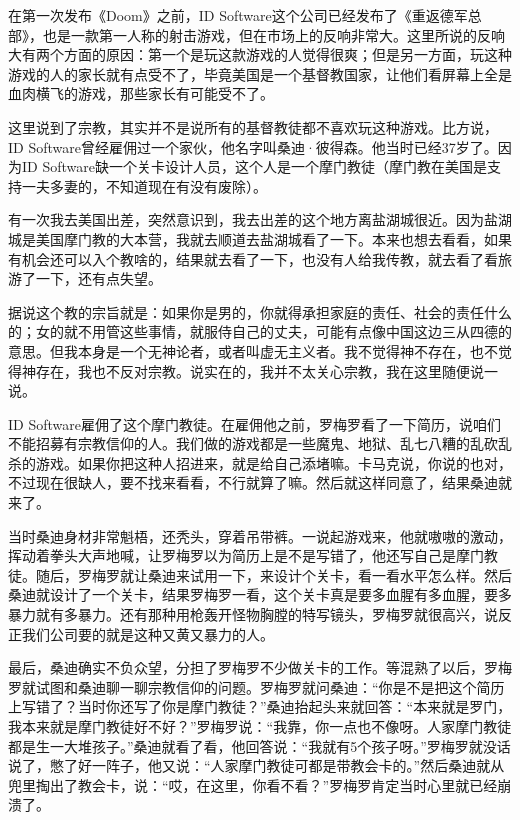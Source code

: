 \documentclass[
  letterpaper,
  DIV=11,
  numbers=noendperiod]{scrreprt}
\begin{document}
在第一次发布《Doom》之前，ID
Software这个公司已经发布了《重返德军总部》，也是一款第一人称的射击游戏，但在市场上的反响非常大。这里所说的反响大有两个方面的原因：第一个是玩这款游戏的人觉得很爽；但是另一方面，玩这种游戏的人的家长就有点受不了，毕竟美国是一个基督教国家，让他们看屏幕上全是血肉横飞的游戏，那些家长有可能受不了。

这里说到了宗教，其实并不是说所有的基督教徒都不喜欢玩这种游戏。比方说，ID
Software曾经雇佣过一个家伙，他名字叫桑迪·彼得森。他当时已经37岁了。因为ID
Software缺一个关卡设计人员，这个人是一个摩门教徒（摩门教在美国是支持一夫多妻的，不知道现在有没有废除）。

有一次我去美国出差，突然意识到，我去出差的这个地方离盐湖城很近。因为盐湖城是美国摩门教的大本营，我就去顺道去盐湖城看了一下。本来也想去看看，如果有机会还可以入个教啥的，结果就去看了一下，也没有人给我传教，就去看了看旅游了一下，还有点失望。

据说这个教的宗旨就是：如果你是男的，你就得承担家庭的责任、社会的责任什么的；女的就不用管这些事情，就服侍自己的丈夫，可能有点像中国这边三从四德的意思。但我本身是一个无神论者，或者叫虚无主义者。我不觉得神不存在，也不觉得神存在，我也不反对宗教。说实在的，我并不太关心宗教，我在这里随便说一说。

ID
Software雇佣了这个摩门教徒。在雇佣他之前，罗梅罗看了一下简历，说咱们不能招募有宗教信仰的人。我们做的游戏都是一些魔鬼、地狱、乱七八糟的乱砍乱杀的游戏。如果你把这种人招进来，就是给自己添堵嘛。卡马克说，你说的也对，不过现在很缺人，要不找来看看，不行就算了嘛。然后就这样同意了，结果桑迪就来了。

当时桑迪身材非常魁梧，还秃头，穿着吊带裤。一说起游戏来，他就嗷嗷的激动，挥动着拳头大声地喊，让罗梅罗以为简历上是不是写错了，他还写自己是摩门教徒。随后，罗梅罗就让桑迪来试用一下，来设计个关卡，看一看水平怎么样。然后桑迪就设计了一个关卡，结果罗梅罗一看，这个关卡真是要多血腥有多血腥，要多暴力就有多暴力。还有那种用枪轰开怪物胸膛的特写镜头，罗梅罗就很高兴，说反正我们公司要的就是这种又黄又暴力的人。

最后，桑迪确实不负众望，分担了罗梅罗不少做关卡的工作。等混熟了以后，罗梅罗就试图和桑迪聊一聊宗教信仰的问题。罗梅罗就问桑迪：``你是不是把这个简历上写错了？当时你还写了你是摩门教徒？''桑迪抬起头来就回答：``本来就是罗门，我本来就是摩门教徒好不好？''罗梅罗说：``我靠，你一点也不像呀。人家摩门教徒都是生一大堆孩子。''桑迪就看了看，他回答说：``我就有5个孩子呀。''罗梅罗就没话说了，憋了好一阵子，他又说：``人家摩门教徒可都是带教会卡的。''然后桑迪就从兜里掏出了教会卡，说：``哎，在这里，你看不看？''罗梅罗肯定当时心里就已经崩溃了。
\end{document}
